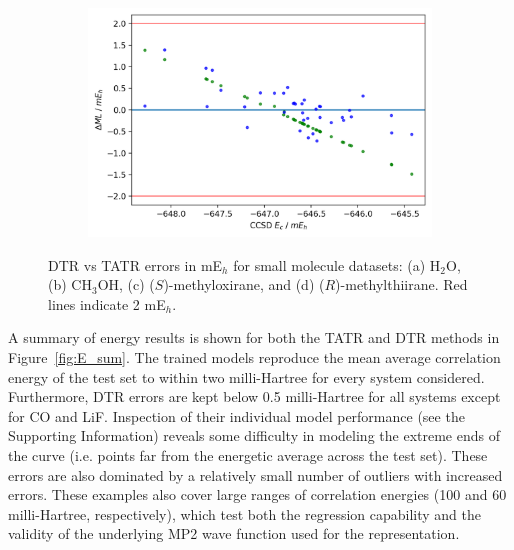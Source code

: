 \begin{figure}
\begin{subfigure}{.5\textwidth}
        \caption{}
        \label{fig:METOX}
    \end{subfigure}%
    \begin{subfigure}{.5\textwidth}
        \centering
        \includegraphics[scale=.55]{p2/figures/metthi_energy.png}
        \caption{}
        \label{fig:METTHI}
    \end{subfigure}
    \caption{DTR vs TATR errors in mE$_h$ for small molecule datasets: (a) H$_2$O, (b) CH$_3$OH, (c) ($\textit{S}$)-methyloxirane, and (d) ($\textit{R}$)-methylthiirane. Red lines indicate 2 mE$_h$.}
    \label{fig:small-E}
\end{figure}

A summary of energy results is shown for both the TATR and DTR methods in Figure~\ref{fig:E_sum}. 
The trained models reproduce the mean average correlation energy of the test set to within two milli-Hartree for every system considered. 
Furthermore, DTR errors are kept below 0.5 milli-Hartree for all systems except for CO and LiF. Inspection of their individual model performance (see the Supporting Information) reveals some difficulty in modeling the extreme ends of the curve (i.e. points far from the energetic average across the test set). These errors are also dominated by a relatively small number of outliers with increased errors. 
These examples also cover large ranges of correlation energies (100 and 60 milli-Hartree, respectively), which test both the regression capability and the validity of the underlying MP2 wave function used for the representation.  

